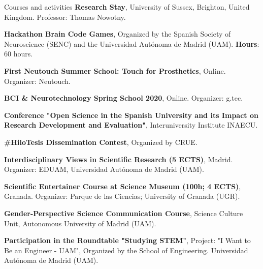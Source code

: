 \begin{rubric}{Courses and activities}
 \textbf{Research Stay}, University of Sussex, Brighton, United Kingdom. Professor: Thomas Nowotny.


\entry*[October 2021] \textbf{Hackathon Brain Code Games}, Organized by the Spanish Society of Neuroscience (SENC) and the Universidad Autónoma de Madrid (UAM). \textbf{Hours}: 60 hours.

\entry*[October 2020] \textbf{First Neutouch Summer School: Touch for Prosthetics}, Online. Organizer: Neutouch.

\entry*[April 2020] \textbf{BCI \& Neurotechnology Spring School 2020}, Online. Organizer: g.tec.






\entry*[January 25, 2023] \textbf{Conference "Open Science in the Spanish University and its Impact on Research Development and Evaluation"}, Interuniversity Institute INAECU.

\entry*[May 2021] \textbf{\#HiloTesis Dissemination Contest}, Organized by CRUE.

 \textbf{Interdisciplinary Views in Scientific Research (5 ECTS)}, Madrid. Organizer: EDUAM, Universidad Autónoma de Madrid (UAM).

 \textbf{Scientific Entertainer Course at Science Museum (100h; 4 ECTS)}, Granada. Organizer: Parque de las Ciencias; University of Granada (UGR).

\entry*[February 2024] \textbf{Gender-Perspective Science Communication Course}, Science Culture Unit, Autonomous University of Madrid (UAM).

\entry*[June 2022] \textbf{Participation in the Roundtable "Studying STEM"}, Project: "I Want to Be an Engineer - UAM", Organized by the School of Engineering. Universidad Autónoma de Madrid (UAM).




\end{rubric}
